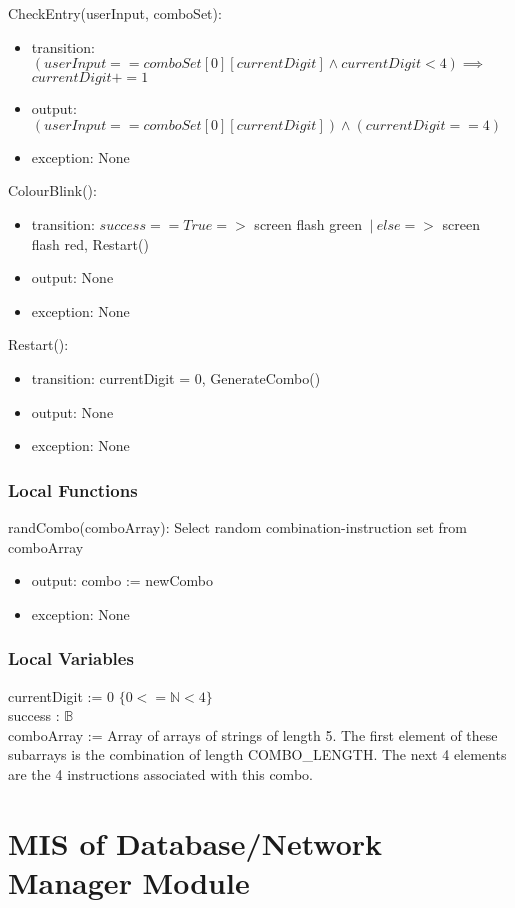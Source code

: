 \documentclass[12pt, titlepage]{article}
\begin{document}
\noindent CheckEntry(userInput, comboSet):
\begin{itemize}
\item transition: $(userInput == comboSet[0][currentDigit] \land currentDigit<4) \implies$\\ $currentDigit+=1$
\item output: $(userInput == comboSet[0][currentDigit]) \land (currentDigit==4)$
\item exception: None
\end{itemize}

\noindent ColourBlink():
\begin{itemize}
\item transition: $success == True =>$ screen flash green $\: | \: else =>$ screen flash red, Restart()
\item output: None
\item exception: None
\end{itemize}

\noindent Restart():
\begin{itemize}
\item transition: currentDigit = 0, GenerateCombo()
\item output: None
\item exception: None
\end{itemize}


\subsubsection{Local Functions}
randCombo(comboArray): Select random combination-instruction set from comboArray
\begin{itemize}
    \item output: combo := newCombo
    \item exception: None
\end{itemize}

\subsubsection{Local Variables}
currentDigit := 0 $\{0<=\mathbb{N}<4\}$\\
success : $\mathds{B}$\\
comboArray := Array of arrays of strings of length 5. The first element of these subarrays is the combination of length COMBO\_LENGTH. The next 4 elements are the 4 instructions associated with this combo.\\
\newpage

\section{MIS of Database/Network Manager Module} \label{sec:DatabaseNetworkModule} 
\end{document}
